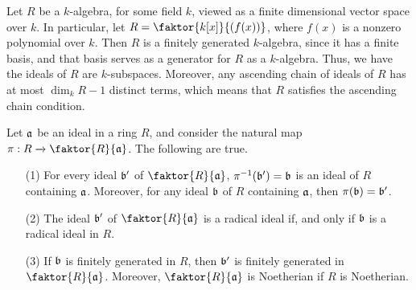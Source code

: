 \begin{example}\label{example_5.25}
  Let $R$ be a  $k$-algebra, for some field  $k$, viewed as a finite
  dimensional vector space over  $k$. In particular, let
  $R=\faktor{k[x]}{(f(x))}$, where $f(x)$ is a nonzero polynomial over $k$.
  Then  $R$ is a finitely generated  $k$-algebra, since it has a finite
  basis, and that basis serves as a generator for $R$ as a  $k$-algebra.
  Thus, we have the ideals of $R$ are $k$-subspaces. Moreover, any ascending
  chain of ideals of $R$ has at most  $\dim_k{R}-1$ distinct terms, which
  means that $R$ satisfies the ascending chain condition.
\end{example}

 \begin{theorem}\label{theorem_5.9.5}
     Let $\af$ be an ideal in a ring $R$, and consider the natural map $\pi:R
     \xrightarrow{} \faktor{R}{\af}$. The following are true.
     \begin{enumerate}
         \item[(1)] For every ideal $\bf'$ of $\faktor{R}{\af}$,
             $\inv{\pi}(\bf')=\bf$ is an ideal of $R$ containing $\af$.
             Moreover, for any ideal $\bf$ of $R$ containing $\af$, then
             $\pi(\bf)=\bf'$.

         \item[(2)] The ideal $\bf'$ of $\faktor{R}{\af}$ is a radical ideal if,
             and only if $\bf$ is a radical ideal in $R$.

         \item[(3)] If $\bf$ is finitely generated in $R$, then $\bf'$ is
             finitely generated in $\faktor{R}{\af}$. Moreover,
             $\faktor{R}{\af}$ is Noetherian if $R$ is Noetherian.
     \end{enumerate}
 \end{theorem}
